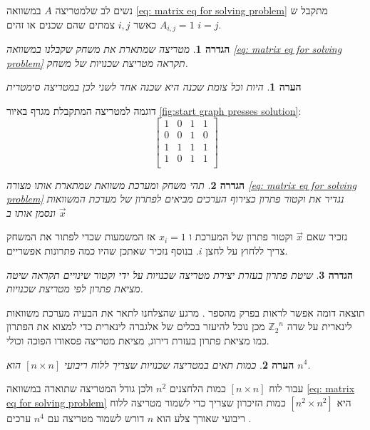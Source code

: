 \documentclass[12pt,leqno]{article}
\newtheorem{definition}{הגדרה}[section]
\newtheorem{comm}{הערה}[section]
\newcommand{\Zn}{{\mathbb{Z}_2}^n}
\begin{document}
נשים לב שלמטריצה
$A$
במשוואה
\ref{eq: matrix eq for solving problem}
מתקבל ש
$A_{i,j} = 1$
כאשר 
$i, j$
צמתים שהם שכנים או זהים
$i = j$.
\begin{definition}
    \label{def: neighbor matrix}
    מטריצה שמתארת את משחק 
    שקבלנו במשוואה
    \ref{eq: matrix eq for solving problem}
    תקראה מטריצת שכנויות של משחק.
\end{definition}
\begin{comm}
    \label{comm: symetic matrix}
    היות וכל צומת שכנה היא שכנה אחד לשני לכן במטריצה
    סימטרית
\end{comm}
דוגמה למטריצה  המתקבלת מגרף באיור 
\ref{fig:start graph presses solution}:
\[
    \begin{bmatrix}
        1 & 0 & 1 & 1\\
        0 & 0 & 1 & 0\\
        1 & 1 & 1 & 1\\
        1 & 0 & 1 & 1\\
    \end{bmatrix}
\]

\begin{definition}
    \label{ def: solution vector}
    תהי משחק ומערכת משוואת שמתארת אותו מצורה 
    \ref{eq: matrix eq for solving problem} 
    נגדיר את וקטור פתרון כצירוף הערכים מביאים לפתרון
    של מערכת המשוואות
    ונסמן אותו ב
    $\vec{x}$
\end{definition}
נזכיר שאם
$\vec{x}$
וקטור פתרון של המערכת 
ו
$x_i = 1$
אז המשמעות שכדי לפתור את המשחק
צריך ללחוץ על לחצן 
$i$.
בנוסף 
נזכיר שאתכן שהיו כמה פתרונות אפשריים.
\begin{definition}
    \label{def: standard solution}
    שיטת פתרון בעזרת יצירת  מטריצה שכנויות על ידי וקטור שינויים תקראה
    שיטה מציאת פתרון לפי מטריצת שכנויות.
\end{definition}
תוצאה דומה אפשר לראות בפרק מהספר
\cite{B2}.
מרגע שהצלחנו לתאר את הבעיה מערכת משוואות לינארית
על שדה
$\Zn$
מכן נוכל להיעזר בכלים של אלגברה לינארית כדי למצוא את הפתרון כמו מציאת פתרון בעזרת דירוג,
מציאת מטריצה פסאודו הפוכה וכולי. 
\begin{comm}
    \label{comm: for board too many variables}
    כמות תאים במטריצה שכנויות שצריך ללוח 
    ריבועי 
    $[n \times n]$
    הוא
    $n^4$.
\end{comm}
עבור לוח 
$[n \times n]$
כמות הלחצנים 
$n^2$
ולכן גודל המטריצה שתוארה במשוואה
\ref{eq: matrix eq for solving problem}
היא 
$[n^2 \times n^2]$
כמות הזיכרון שצריך כדי לשמור מטריצה ללוח ריבועי שאורך צלע הוא
$n$
דורש לשמור מטריצה עם 
$n^4$
ערכים
.
\end{document}
